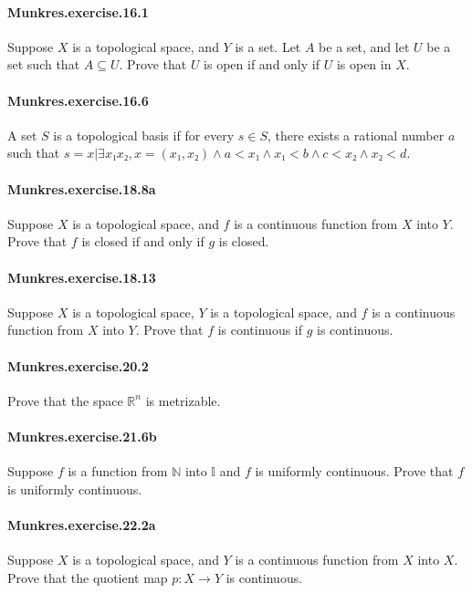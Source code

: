 \documentclass{article}
\begin{document}
\paragraph{Munkres.exercise.16.1} Suppose $X$ is a topological space, and $Y$ is a set. Let $A$ be a set, and let $U$ be a set such that $A \subseteq U$. Prove that $U$ is open if and only if $U$ is open in $X$.

\paragraph{Munkres.exercise.16.6} A set $S$ is a topological basis if for every $s \in S$, there exists a rational number $a$ such that $s = {x | ∃ x₁ x₂, x = (x₁, x₂) ∧ a < x₁ ∧ x₁ < b ∧ c < x₂ ∧ x₂ < d}$.

\paragraph{Munkres.exercise.18.8a} Suppose $X$ is a topological space, and $f$ is a continuous function from $X$ into $Y$. Prove that $f$ is closed if and only if $g$ is closed.

\paragraph{Munkres.exercise.18.13} Suppose $X$ is a topological space, $Y$ is a topological space, and $f$ is a continuous function from $X$ into $Y$. Prove that $f$ is continuous if $g$ is continuous.

\paragraph{Munkres.exercise.20.2} Prove that the space $\mathbb{R}^n$ is metrizable.

\paragraph{Munkres.exercise.21.6b} Suppose $f$ is a function from $\mathbb{N}$ into $\mathbb{I}$ and $f$ is uniformly continuous. Prove that $f$ is uniformly continuous.

\paragraph{Munkres.exercise.22.2a} Suppose $X$ is a topological space, and $Y$ is a continuous function from $X$ into $X$. Prove that the quotient map $p: X → Y$ is continuous.
\end{document}

